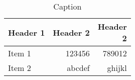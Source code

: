 \begin{table}
    \centering
    \caption{Caption}
    \label{tab:Standard}
    \begin{tabular}{lrr} \toprule
         Header 1 & Header 2 & \makecell[cr]{Header\\2} \\ \midrule
         Item 1 & 123456 & 789012 \\
         Item 2 & abcdef & ghijkl \\ \bottomrule
    \end{tabular}
\end{table}